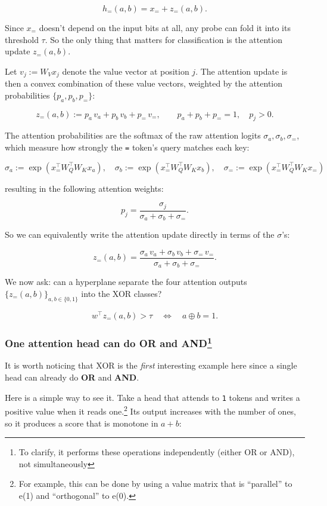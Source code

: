 \documentclass[
  11pt,
]{article}
\begin{document}
\[
h_=(a,b) = x_= + z_=(a,b).
\]

Since \(x_=\) doesn't depend on the input bits at all, any probe can
fold it into its threshold \(\tau\). So the only thing that matters for
classification is the attention update \(z_=(a,b)\).

Let \(v_j := W_V x_j\) denote the value vector at position \(j\). The
attention update is then a convex combination of these value vectors,
weighted by the attention probabilities \(\{p_a, p_b, p_=\}\):

\[
z_=(a,b) := p_a\, v_a + p_b\, v_b + p_=\, v_=, \qquad p_a + p_b + p_= = 1,\quad p_j > 0.
\]

The attention probabilities are the softmax of the raw attention logits
\(\sigma_a, \sigma_b, \sigma_=\), which measure how strongly the
\texttt{=} token's query matches each key:

\[
\sigma_a := \exp(x_=^\top W_Q^\top W_K x_a), \quad \sigma_b := \exp(x_=^\top W_Q^\top W_K x_b), \quad \sigma_= := \exp(x_=^\top W_Q^\top W_K x_=)
\]

resulting in the following attention weights:

\[
p_j = \dfrac{\sigma_j}{\sigma_a + \sigma_b + \sigma_=}.
\]

So we can equivalently write the attention update directly in terms of
the \(\sigma\)'s:

\[
z_=(a,b) = \dfrac{\sigma_a\, v_a + \sigma_b\, v_b + \sigma_=\, v_=}{\sigma_a + \sigma_b + \sigma_=}.
\]

We now ask: can a hyperplane separate the four attention outputs
\(\{z_=(a,b)\}_{a,b \in \{0,1\}}\) into the XOR classes?

\[
w^\top z_=(a,b) > \tau \quad\Longleftrightarrow\quad a \oplus b = 1.
\]

\subsubsection[One attention head can do OR and AND]{\texorpdfstring{One
attention head can do OR and
AND\footnote{To clarify, it performs these operations independently
  (either OR or AND), not simultaneously}}{One attention head can do OR and AND}}\label{one-attention-head-can-do-or-and-andtk3jlhien1e}

It is worth noticing that XOR is the \emph{first} interesting example
here since a single head can already do \textbf{OR} and \textbf{AND}.

Here is a simple way to see it. Take a head that attends to \texttt{1}
tokens and writes a positive value when it reads one.\footnote{For
  example, this can be done by using a value matrix that is ``parallel''
  to e(1) and ``orthogonal'' to e(0).} Its output increases with the
number of ones, so it produces a score that is monotone in \(a+b\):
\end{document}
